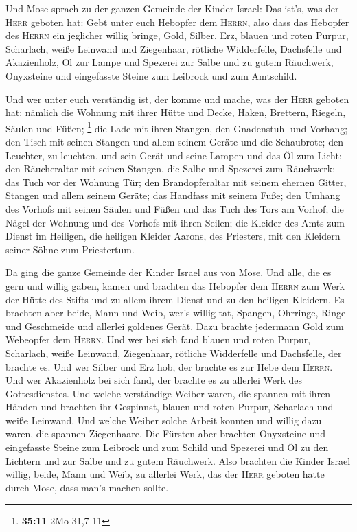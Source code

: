  Und Mose sprach zu der ganzen Gemeinde der Kinder Israel:
Das ist's, was der \textsc{Herr} geboten hat:  Gebt unter
euch Hebopfer dem \textsc{Herrn}, also dass das Hebopfer des
\textsc{Herrn} ein jeglicher willig bringe, Gold, Silber, Erz,
 blauen und roten Purpur, Scharlach, weiße Leinwand und
Ziegenhaar,  rötliche Widderfelle, Dachsfelle und
Akazienholz,  Öl zur Lampe und Spezerei zur Salbe und zu
gutem Räuchwerk,  Onyxsteine und eingefasste Steine zum
Leibrock und zum Amtschild.

 Und wer unter euch verständig ist, der komme und mache,
was der \textsc{Herr} geboten hat:  nämlich die Wohnung
mit ihrer Hütte und Decke, Haken, Brettern, Riegeln, Säulen und Füßen;
\footnote{\textbf{35:11} 2Mo 31,7-11}  die Lade mit ihren
Stangen, den Gnadenstuhl und Vorhang;  den Tisch mit
seinen Stangen und allem seinem Geräte und die Schaubrote;
 den Leuchter, zu leuchten, und sein Gerät und seine
Lampen und das Öl zum Licht;  den Räucheraltar mit seinen
Stangen, die Salbe und Spezerei zum Räuchwerk; das Tuch vor der Wohnung
Tür;  den Brandopferaltar mit seinem ehernen Gitter,
Stangen und allem seinem Geräte; das Handfass mit seinem Fuße;
 den Umhang des Vorhofs mit seinen Säulen und Füßen und
das Tuch des Tors am Vorhof;  die Nägel der Wohnung und
des Vorhofs mit ihren Seilen;  die Kleider des Amts zum
Dienst im Heiligen, die heiligen Kleider Aarons, des Priesters, mit den
Kleidern seiner Söhne zum Priestertum.

 Da ging die ganze Gemeinde der Kinder Israel aus von
Mose.  Und alle, die es gern und willig gaben, kamen und
brachten das Hebopfer dem \textsc{Herrn} zum Werk der Hütte des Stifts
und zu allem ihrem Dienst und zu den heiligen Kleidern. 
Es brachten aber beide, Mann und Weib, wer's willig tat, Spangen,
Ohrringe, Ringe und Geschmeide und allerlei goldenes Gerät. Dazu brachte
jedermann Gold zum Webeopfer dem \textsc{Herrn}.  Und wer
bei sich fand blauen und roten Purpur, Scharlach, weiße Leinwand,
Ziegenhaar, rötliche Widderfelle und Dachsfelle, der brachte es.
 Und wer Silber und Erz hob, der brachte es zur Hebe dem
\textsc{Herrn}. Und wer Akazienholz bei sich fand, der brachte es zu
allerlei Werk des Gottesdienstes.  Und welche verständige
Weiber waren, die spannen mit ihren Händen und brachten ihr Gespinnst,
blauen und roten Purpur, Scharlach und weiße Leinwand. 
Und welche Weiber solche Arbeit konnten und willig dazu waren, die
spannen Ziegenhaare.  Die Fürsten aber brachten
Onyxsteine und eingefasste Steine zum Leibrock und zum Schild
 und Spezerei und Öl zu den Lichtern und zur Salbe und zu
gutem Räuchwerk.  Also brachten die Kinder Israel willig,
beide, Mann und Weib, zu allerlei Werk, das der \textsc{Herr} geboten
hatte durch Mose, dass man's machen sollte.

